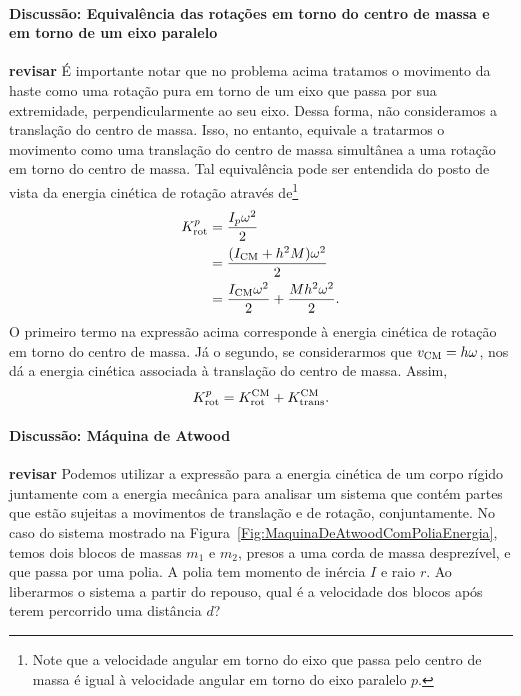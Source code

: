 \paragraph{Discussão: Equivalência das rotações em torno do centro de massa e em torno de um eixo paralelo}
\textbf{revisar}
É importante notar que no problema acima tratamos o movimento da haste como uma rotação pura em torno de um eixo que passa por sua extremidade, perpendicularmente ao seu eixo. Dessa forma, não consideramos a translação do centro de massa. Isso, no entanto, equivale a tratarmos o movimento como uma translação do centro de massa simultânea a uma rotação em torno do centro de massa. Tal equivalência pode ser entendida do posto de vista da energia cinética de rotação através de\footnote{Note que a velocidade angular em torno do eixo que passa pelo centro de massa é igual à velocidade angular em torno do eixo paralelo $p$.}
\begin{align}
    K_{\rm{rot}}^p &= \frac{I_p\omega^2}{2} \\
    &= \frac{(I_{\rm{CM}} + h^2M)\omega^2}{2} \\
    &= \frac{I_{\rm{CM}}\omega^2}{2} + \frac{Mh^2\omega^2}{2}.
\end{align}
%
O primeiro termo na expressão acima corresponde à energia cinética de rotação em torno do centro de massa. Já o segundo, se considerarmos que $v_{\rm{CM}} = h\omega$, nos dá a energia cinética associada à translação do centro de massa. Assim,
\begin{equation}
    K_{\rm{rot}}^p = K_{\rm{rot}}^{\rm{CM}} + K_{\rm{trans}}^{\rm{CM}}.
\end{equation}

\paragraph{Discussão: Máquina de Atwood}
\textbf{revisar}
Podemos utilizar a expressão para a energia cinética de um corpo rígido juntamente com a energia mecânica para analisar um sistema que contém partes que estão sujeitas a movimentos de translação e de rotação, conjuntamente. No caso do sistema mostrado na Figura~\ref{Fig:MaquinaDeAtwoodComPoliaEnergia}, temos dois blocos de massas $m_1$ e $m_2$, presos a uma corda de massa desprezível, e que passa por uma polia. A polia tem momento de inércia $I$ e raio $r$. Ao liberarmos o sistema a partir do repouso, qual é a velocidade dos blocos após terem percorrido uma distância $d$?

